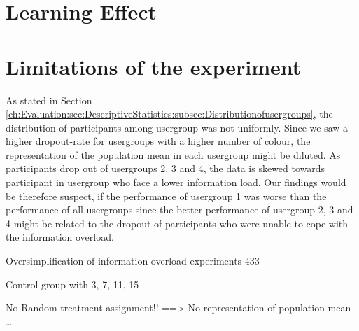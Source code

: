 
\section{Learning Effect}



\section{Limitations of the experiment}
As stated in Section \ref{ch:Evaluation:sec:DescriptiveStatistics:subsec:Distributionofusergroups}, the distribution of participants among usergroup was not uniformly. Since we saw a higher dropout-rate for usergroups with a higher number of colour, the representation of the population mean in each usergroup might be diluted. As participants drop out of usergroups 2, 3 and 4, the data is skewed towards participant in usergroup who face a lower information load. Our findings would be therefore suspect, if the performance of usergroup 1 was worse than the performance of all usergroups since the better performance of usergroup 2, 3 and 4 might be related to the dropout of participants who were unable to cope with the information overload.

Oversimplification of information overload experiments 433 \cite{Jacoby1984}

Control group with 3, 7, 11, 15

No Random treatment assignment!! ==> No representation of population mean
\dots




